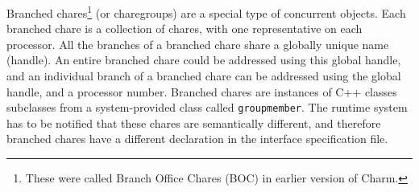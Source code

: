 Branched chares\footnote{
  These were called Branch Office Chares (BOC) in earlier version of Charm.
} (or charegroups) are a special type of concurrent objects.
Each branched chare is a collection of chares, with one representative on
each processor. All the branches of a branched chare share a globally
unique name (handle). An entire branched chare could be addressed using
this global handle, and an individual branch of a branched chare can be
addressed using the global handle, and a processor number. Branched chares
are instances of C++ classes subclasses from a system-provided class called
{\tt groupmember}. The runtime system has to be notified that these
chares are semantically different, and therefore branched chares have 
a different declaration in the interface specification file.
